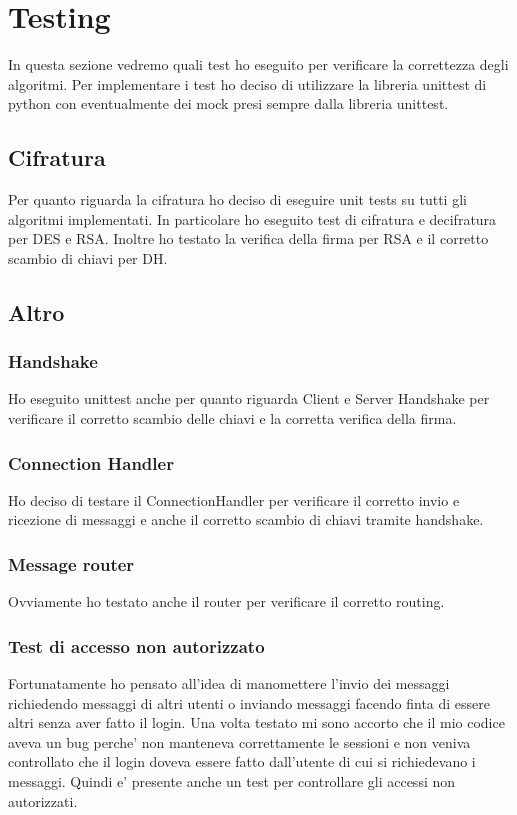 \chapter{Testing}
In questa sezione vedremo quali test ho eseguito per verificare la correttezza degli algoritmi.
Per implementare i test ho deciso di utilizzare la libreria unittest di python con
eventualmente dei mock presi sempre dalla libreria unittest.

\section{Cifratura}
Per quanto riguarda la cifratura ho deciso di eseguire unit tests su tutti gli algoritmi
implementati. In particolare ho eseguito test di cifratura e decifratura per DES e RSA. Inoltre ho
testato la verifica della firma per RSA e il corretto scambio di chiavi per DH.

\section{Altro}

\subsection{Handshake}
Ho eseguito unittest anche per quanto riguarda Client e Server Handshake per verificare il corretto
scambio delle chiavi e la corretta verifica della firma.

\subsection{Connection Handler}
Ho deciso di testare il ConnectionHandler per verificare il corretto invio e ricezione di messaggi e
anche il corretto scambio di chiavi tramite handshake.

\subsection{Message router}
Ovviamente ho testato anche il router per verificare il corretto routing.

\subsection{Test di accesso non autorizzato}
Fortunatamente ho pensato all'idea di manomettere l'invio dei messaggi richiedendo messaggi di
altri utenti o inviando messaggi facendo finta di essere altri senza aver fatto il login. Una volta
testato mi sono accorto che il mio codice aveva un bug perche' non manteneva correttamente le
sessioni e non veniva controllato che il login doveva essere fatto dall'utente di cui si
richiedevano i messaggi. Quindi e' presente anche un test per controllare gli accessi non
autorizzati.
